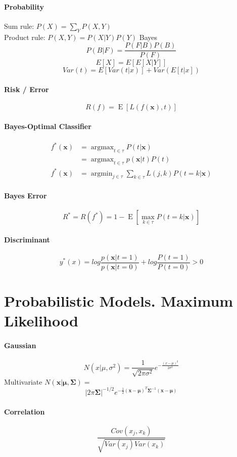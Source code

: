 \documentclass[7pt]{scrartcl}
\DeclareMathOperator*{\argmax}{argmax}
\DeclareMathOperator*{\argmin}{argmin}
\DeclareMathOperator{\E}{E}
\begin{document}
\begin{multicols}{4}
\paragraph{Probability}
\[\]
Sum rule: $P(X) = \sum_Y P(X,Y)$\\
Product rule: $P(X,Y) = P(X|Y)P(Y)$
Bayes  \[P(B|F) = \frac{P(F|B)P(B)}{P(F)}\]
\[E[X] = E[E[X|Y]]\]
\[Var(t) = E[Var(t|x)] + Var(E[t|x]) \]
\paragraph{Risk / Error}
\[ R(f) = \E \left [ L(f(\mathbf x), t) \right ] \]

\paragraph{Bayes-Optimal Classifier}
\begin{align*}
f^*(\mathbf x) &= \argmax_{t \in \tau} P(t|\mathbf x) \\ 
&= \argmax_{t \in \tau} p(\mathbf x|t) P(t) \\
f^*(\mathbf x) &= \argmin_{j \in \tau} \sum_{k \in \tau} L(j,k) P(t = k | \mathbf x) \end{align*}

\paragraph{Bayes Error}
\[ R^* = R(f^*) = 1 - \E \left [ \max_{k\in\tau} P(t = k | \mathbf x) \right ] \]

\paragraph{Discriminant}
\[y^*(x) = log \frac{p(\mathbf{x}|t=1)}{p(\mathbf{x}|t=0)} + log \frac{P(t=1)}{P(t=0)} > 0\]
\section{Probabilistic Models. Maximum Likelihood}
\paragraph{Gaussian}
\[N(x|\mu,\sigma^2) = \frac{1}{\sqrt{2\pi\sigma^2}} e^{-\frac{(x-\mu)^2}{2\sigma^2}}\]
Multivariate $N(\mathbf{x}|\mathbf{\mu},\mathbf{\Sigma}) =$
\[|2\pi\mathbf{\Sigma}|^{-1/2} e^{-\frac{1}{2}(\mathbf{x}-\mathbf{\mu})^T\mathbf{\Sigma}^{-1}(\mathbf{x}-\mathbf{\mu})}\]

\paragraph{Correlation}
\[\frac{Cov(x_j,x_k)}{\sqrt{Var(x_j)Var(x_k)}}\]


\end{multicols}
\end{document}
